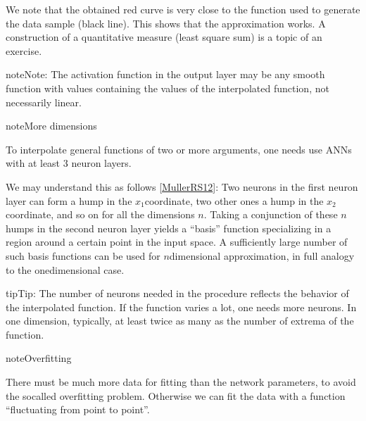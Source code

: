 \documentclass[letterpaper,10pt,english]{jupyterBook}
\begin{document}
\noindent{}

\sphinxAtStartPar
We note that the obtained red curve is very close to the function used to generate the data sample (black line). This shows that the approximation works. A construction of a quantitative measure (least square sum) is a topic of an exercise.

\begin{sphinxadmonition}{note}{Note:}
\sphinxAtStartPar
The activation function in the output layer may be any smooth function with values containing the values of the interpolated function, not necessarily linear.
\end{sphinxadmonition}

\begin{sphinxadmonition}{note}{More dimensions}

\sphinxAtStartPar
To interpolate general functions of two or more arguments, one needs use ANNs with at least 3 neuron layers.
\end{sphinxadmonition}

\sphinxAtStartPar
We may understand this as follows {[}\hyperlink{cite.docs/conclusion:id7}{MullerRS12}{]}: Two neurons in the first neuron layer can form a hump in the \(x_1\)\sphinxhyphen{}coordinate, two other ones a hump in the \(x_2\)\sphinxhyphen{}coordinate, and so on for all the dimensions \(n\). Taking a conjunction of these \(n\) humps in the second neuron layer yields a “basis” function specializing in a region around a certain point in the input space. A sufficiently large number of such basis functions can be used for \(n\)\sphinxhyphen{}dimensional approximation, in full analogy to the one\sphinxhyphen{}dimensional case.

\begin{sphinxadmonition}{tip}{Tip:}
\sphinxAtStartPar
The number of neurons needed in the procedure reflects the behavior of the interpolated function. If the function varies a lot, one needs more neurons. In one dimension, typically, at least twice as many as the number of extrema of the function.
\end{sphinxadmonition}

\begin{sphinxadmonition}{note}{Overfitting}

\sphinxAtStartPar
There must be much more data for fitting than the network parameters, to avoid the so\sphinxhyphen{}called overfitting problem. Otherwise we can fit the data with a function “fluctuating from point to point”.
\end{sphinxadmonition}
\end{document}
